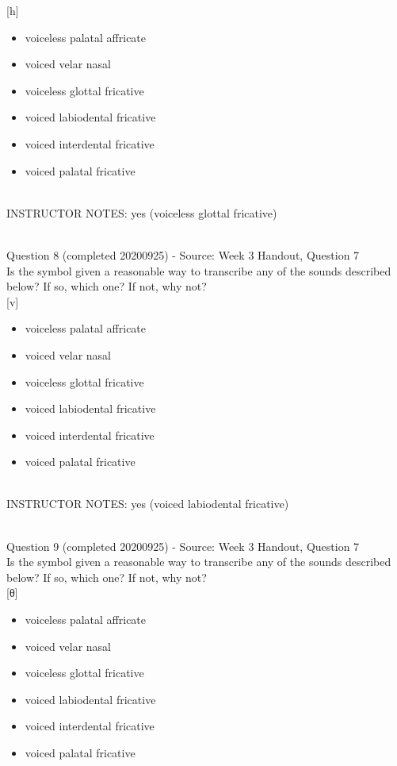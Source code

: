 \documentclass[12pt]{article}
\begin{document}
{[h]}

\begin{itemize} \item voiceless palatal affricate \item voiced velar nasal \item voiceless glottal fricative \item voiced labiodental fricative \item voiced interdental fricative \item voiced palatal fricative \end{itemize}


~\\
INSTRUCTOR NOTES: yes (voiceless glottal fricative)


~\\

{\large Question 8} (completed 20200925) - Source: Week 3 Handout, Question 7\\

Is the symbol given a reasonable way to transcribe any of the sounds described below? If so, which one? If not, why not?\\

{[v]}

\begin{itemize} \item voiceless palatal affricate \item voiced velar nasal \item voiceless glottal fricative \item voiced labiodental fricative \item voiced interdental fricative \item voiced palatal fricative \end{itemize}


~\\
INSTRUCTOR NOTES: yes (voiced labiodental fricative)


~\\

{\large Question 9} (completed 20200925) - Source: Week 3 Handout, Question 7\\

Is the symbol given a reasonable way to transcribe any of the sounds described below? If so, which one? If not, why not?\\

{[θ]}

\begin{itemize} \item voiceless palatal affricate \item voiced velar nasal \item voiceless glottal fricative \item voiced labiodental fricative \item voiced interdental fricative \item voiced palatal fricative \end{itemize}
\end{document}
